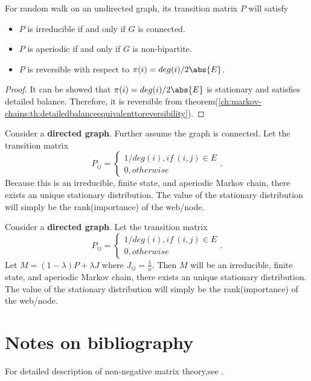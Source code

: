 \begin{refsection}
\begin{lemma}
For random walk on an undirected graph, its transition matrix $P$ will satisfy 
\begin{itemize}
	\item $P$ is irreducible if and only if $G$ is connected.
	\item $P$ is aperiodic if and only if $G$ is non-bipartite.
	\item $P$ is reversible with respect to $\pi(i) = deg(i)/2\abs{E}$.
\end{itemize}
\end{lemma}
\begin{proof}
It can be showed that $\pi(i) = deg(i)/2\abs{E}$ is stationary and satisfies detailed balance. Therefore, it is reversible from theorem(\autoref{ch:markov-chains:th:detailedbalanceequivalenttoreversibility}).
\end{proof}

\begin{example}
Consider a \textbf{directed graph}. Further assume the graph is connected. Let the transition matrix $$P_{ij} = \begin{cases}
1/deg(i), if ~ (i,j)\in E\\
0, otherwise
\end{cases}.$$
Because this is an irreducible, finite state, and aperiodic Markov chain, there exists an unique stationary distribution. The value of the stationary distribution will simply be the rank(importance) of the web/node. 
\end{example}

\begin{example}
	Consider a \textbf{directed graph}.  Let the transition matrix $$P_{ij} = \begin{cases}
	1/deg(i), if ~ (i,j)\in E\\
	0, otherwise
	\end{cases}.$$
	Let $M = (1-\lambda)P + \lambda J$
	where $J_{ij} = \frac{1}{n}$.
	Then $M$ will be an irreducible, finite state, and aperiodic Markov chain, there exists an unique stationary distribution. The value of the stationary distribution will simply be the rank(importance) of the web/node. 
\end{example}



\section{Notes on bibliography}
For detailed description of non-negative matrix theory,see \cite{meyer2000matrix}\cite{cinlar2013introduction}.


\end{refsection}
